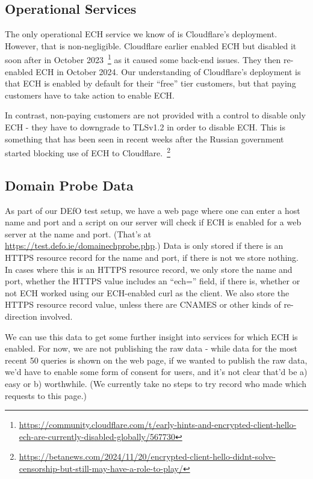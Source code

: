 \subsection{Operational Services}

The only operational ECH service we know of is Cloudflare's deployment.
However, that is non-negligible.  Cloudflare earlier enabled ECH but disabled
it soon after in
October 2023~\footnote{\url{https://community.cloudflare.com/t/early-hints-and-encrypted-client-hello-ech-are-currently-disabled-globally/567730}}
as it caused some back-end issues. They then re-enabled ECH in October 2024.
Our understanding of Cloudflare's deployment is that ECH is enabled by 
default for their ``free'' tier customers, but that paying customers have to
take action to enable ECH.

In contrast, non-paying customers are not provided with a control to disable
only ECH - they have to downgrade to TLSv1.2 in order to disable ECH. This
is something that has been seen in recent weeks after the Russian government
started blocking use of ECH to
Cloudflare.~\footnote{\url{https://betanews.com/2024/11/20/encrypted-client-hello-didnt-solve-censorship-but-still-may-have-a-role-to-play/}}

\subsection{Domain Probe Data}

As part of our DEfO test setup, we have a web page where one can enter a host
name and port and a script on our server will check if ECH is enabled for a web
server at the name and port. (That's at
\url{https://test.defo.ie/domainechprobe.php}.) Data is only stored if there is
an HTTPS resource record for the name and port, if there is not we store
nothing. In cases where this is an HTTPS resource record, we only store the
name and port, whether the HTTPS value includes an ``ech='' field, if there is,
whether or not ECH worked using our ECH-enabled curl as the client. We also
store the HTTPS resource record value, unless there are CNAMES or other
kinds of re-direction involved.

We can use this data to get some further insight into services for which ECH
is enabled. For now, we are not publishing the raw data - while data for the most
recent 50 queries is shown on the web page, if we wanted to publish the raw
data, we'd have to enable some form of consent for users, and it's not clear
that'd be a) easy or b) worthwhile. (We currently take no steps to try record
who made which requests to this page.)

